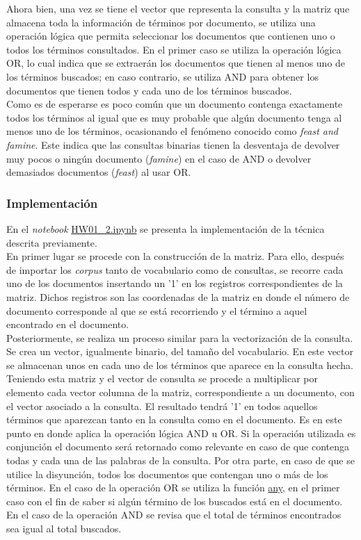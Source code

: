Ahora bien, una vez se tiene el vector que representa la consulta y la matriz que almacena toda la información de términos por documento, se utiliza una operación lógica que permita seleccionar los documentos que contienen uno o todos los términos consultados. En el primer caso se utiliza la operación lógica OR, lo cual indica que se extraerán los documentos que tienen al menos uno de los términos buscados; en caso contrario, se utiliza AND para obtener los documentos que tienen todos y cada uno de los términos buscados.\\

Como es de esperarse es poco común que un documento contenga exactamente todos los términos al igual que es muy probable que algún documento tenga al menos uno de los términos, ocasionando el fenómeno conocido como \textit{feast and famine}. Este indica que las consultas binarias tienen la desventaja de devolver muy pocos o ningún documento (\textit{famine}) en el caso de AND o devolver demasiados documentos (\textit{feast}) al usar OR.

\subsubsection{Implementación}
En el \textit{notebook} \url{HW01_2.ipynb} se presenta la implementación de la técnica descrita previamente.\\

En primer lugar se procede con la construcción de la matriz. Para ello, después de importar los \textit{corpus} tanto de vocabulario como de consultas, se recorre cada uno de los documentos insertando un '1' en los registros correspondientes de la matriz. Dichos registros son las coordenadas de la matriz en donde el número de documento corresponde al que se está recorriendo y el término a aquel encontrado en el documento.\\

Posteriormente, se realiza un proceso similar para la vectorización de la consulta. Se crea un vector, igualmente binario, del tamaño del vocabulario. En este vector se almacenan unos en cada uno de los términos que aparece en la consulta hecha.\\

Teniendo esta matriz y el vector de consulta se procede a multiplicar por elemento cada vector columna de la matriz, correspondiente a un documento, con el vector asociado a la consulta. El resultado tendrá '1' en todos aquellos términos que aparezcan tanto en la consulta como en el documento. Es en este punto en donde aplica la operación lógica AND u OR. Si la operación utilizada es conjunción el documento será retornado como relevante en caso de que contenga todas y cada una de las palabras de la consulta. Por otra parte, en caso de que se utilice la disyunción, todos los documentos que contengan uno o más de los términos. En el caso de la operación OR se utiliza la función \url{any}, en el primer caso con el fin de saber si algún término de los buscados está en el documento. En el caso de la operación AND se revisa que el total de términos encontrados sea igual al total buscados.\\

